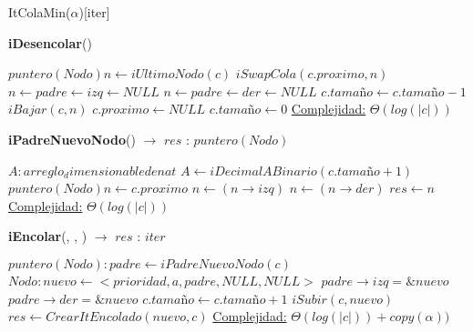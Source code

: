 \begin{Estructura}{ItColaMin($\alpha$)}[iter]
\begin{algorithm}[H]{\textbf{iDesencolar}()}
    	\begin{algorithmic}[1]
			\State $puntero(Nodo) n \gets iUltimoNodo(c)$ 
			\State $iSwapCola(c.proximo, n) $ 
					\State $n \leftarrow padre \leftarrow izq \gets NULL $
				\Else
					\State $n \leftarrow padre \leftarrow der \gets NULL $
				\EndIf	
				\State $c.tamaño \gets c.tamaño - 1$ 						
				\State $iBajar(c,n) $ 
			\Else
				\State $c.proximo \gets NULL $
				\State $c.tamaño \gets 0$ 						
			\EndIf
			\medskip
			\Statex \underline{Complejidad:} $\Theta(log(|c|))$
    	\end{algorithmic}
\end{algorithm}

\begin{algorithm}[H]{\textbf{iPadreNuevoNodo}() $\to$ $res$ : $puntero(Nodo)$}
    	\begin{algorithmic}[1]
			\State $A: arreglo_dimensionable de nat$ 
			\State $A \gets iDecimalABinario(c.tamaño + 1) $ 
			\State $puntero(Nodo) n \gets c.proximo$ 
			 
					\State $n \gets (n \rightarrow izq)$ 
				\Else
					\State $n \gets (n \rightarrow der)$ 
				\EndIf
			\EndFor
			\State $res \gets n$ 
    	\medskip
		\Statex \underline{Complejidad:} $\Theta(log(|c|))$
    	\end{algorithmic}
\end{algorithm}

\begin{algorithm}[H]{\textbf{iEncolar}(, , )  $\to$ $res$ : $iter$ }
    	\begin{algorithmic}[1]
			\State $puntero(Nodo): padre \gets iPadreNuevoNodo(c)$ 
			\State $Nodo: nuevo \gets <prioridad, a, padre, NULL, NULL> $ 						
			 
				\State $padre \rightarrow izq = \& nuevo$ 
			\Else
				\State $padre \rightarrow der = \& nuevo$ 
			\EndIf			
			\State $c.tamaño \gets c.tamaño + 1$ 						
			\State $iSubir(c, nuevo) $ 
			\State $res \gets CrearItEncolado(nuevo, c) $ 
			\medskip
			\Statex \underline{Complejidad:} $\Theta(log(|c|)) + copy(\alpha))$
    	\end{algorithmic}
\end{algorithm}
    	

\end{Estructura}
